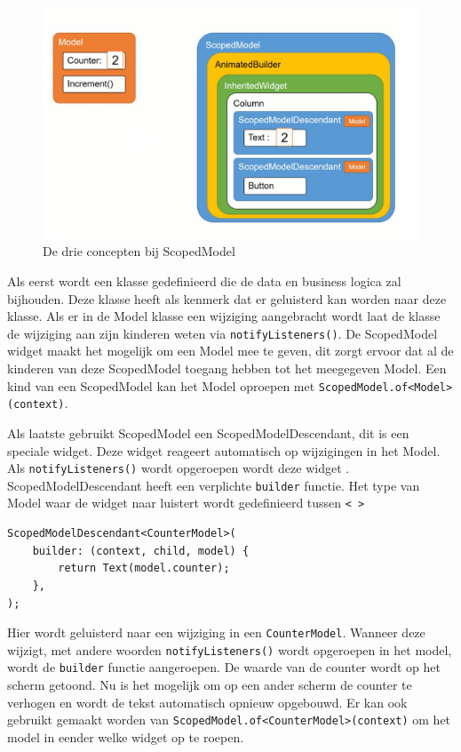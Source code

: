 \begin{figure}[H]
    \includegraphics[width=\linewidth]{img/stand-van-zaken/scopedmodel.jpg}
    \caption{De drie concepten bij ScopedModel \autocite{Boelens2019}}
    \label{fig:scopedmodel}
\end{figure}
Als eerst wordt een klasse gedefinieerd die de 
data en business logica zal bijhouden. Deze klasse heeft als kenmerk dat er geluisterd kan worden naar deze klasse. Als er in de Model klasse een wijziging aangebracht wordt laat de klasse de wijziging aan zijn kinderen weten via \verb|notifyListeners()|.
\newline
De ScopedModel widget maakt het mogelijk om een Model mee te geven, dit zorgt ervoor dat al de kinderen van deze ScopedModel toegang hebben tot het meegegeven Model. Een kind van een ScopedModel kan het Model oproepen met \verb|ScopedModel.of<Model>(context)|.

Als laatste gebruikt ScopedModel een ScopedModelDescendant, dit is een speciale widget. Deze widget reageert automatisch op wijzigingen in het Model. Als \verb|notifyListeners()| wordt opgeroepen wordt deze widget .
ScopedModelDescendant heeft een verplichte \verb|builder| functie. Het type van Model waar de widget naar luistert wordt gedefinieerd tussen \verb|< >|
\begin{verbatim}
ScopedModelDescendant<CounterModel>(
    builder: (context, child, model) {
        return Text(model.counter);
    },
);
\end{verbatim}
Hier wordt geluisterd naar een wijziging in een \verb|CounterModel|. Wanneer deze wijzigt, met andere woorden \verb|notifyListeners()| wordt opgeroepen in het model, wordt de \verb|builder| functie aangeroepen. De waarde van de counter wordt op het scherm getoond. Nu is het mogelijk om op een ander scherm de counter te verhogen en wordt de tekst automatisch opnieuw opgebouwd. Er kan ook gebruikt gemaakt worden van \verb|ScopedModel.of<CounterModel>(context)| om het model in eender welke widget op te roepen. 


